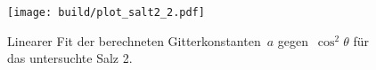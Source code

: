 \begin{figure}[htb]
  \centering
  \texttt{[image: build/plot\_salt2\_2.pdf]}
  \caption{Linearer Fit der berechneten Gitterkonstanten~$a$
  gegen~$\cos^2\theta$ für das untersuchte Salz 2.}
  \label{fig:salz2}
\end{figure}
